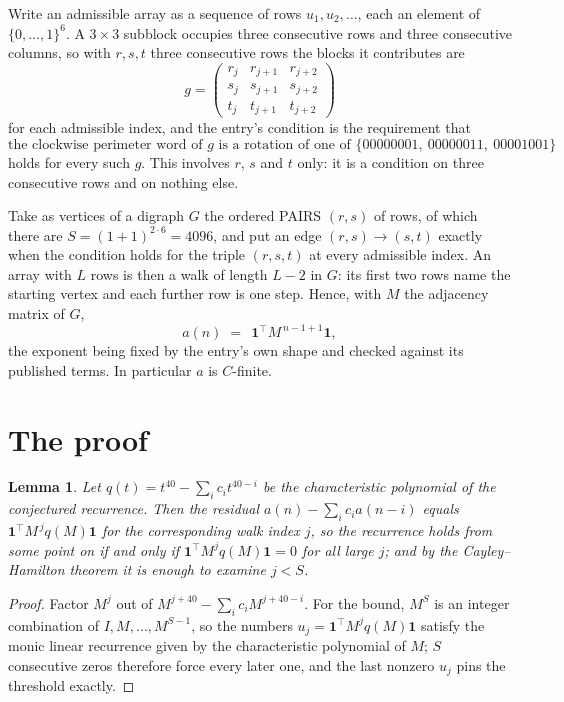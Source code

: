 \documentclass[11pt,a4paper]{article}
\theoremstyle{plain}
\newtheorem{lemma}[theorem]{Lemma}
\theoremstyle{definition}
\begin{document}
Write an admissible array as a sequence of rows $u_1,u_2,\dots$, each an element of
$\{0,\dots,1\}^{6}$. A $3\times3$ subblock occupies three consecutive rows and
three consecutive columns, so with $r,s,t$ three consecutive rows the blocks it
contributes are
\[
g=\begin{pmatrix}r_j&r_{j+1}&r_{j+2}\\ s_j&s_{j+1}&s_{j+2}\\ t_j&t_{j+1}&t_{j+2}\end{pmatrix}
\]
for each admissible index, and the entry's condition is the requirement that
\[
\text{the clockwise perimeter word of }g\text{ is a rotation of one of }\{00000001,\ 00000011,\ 00001001\}
\]
holds for every such $g$. This involves $r$, $s$ and $t$ only: it is a condition on
three consecutive rows and on nothing else.

Take as vertices of a digraph $G$ the ordered PAIRS $(r,s)$ of rows, of which there are
$S=(1+1)^{2\cdot6}=4096$, and put an edge $(r,s)\to(s,t)$ exactly when the condition
holds for the triple $(r,s,t)$ at every admissible index. An array with $L$ rows is then a
walk of length $L-2$ in $G$: its first two rows name the starting vertex and each further
row is one step. Hence, with $M$ the adjacency matrix of $G$,
\[
a(n)\;=\;\,\mathbf{1}^{\!\top}M^{\,n-1+1}\mathbf{1},
\]
the exponent being fixed by the entry's own shape and checked against its published terms.
In particular $a$ is $C$-finite.

\section{The proof}

\begin{lemma}\label{lem:crit}
Let $q(t)=t^{40}-\sum_i c_it^{40-i}$ be the characteristic polynomial of the
conjectured recurrence. Then the residual $a(n)-\sum_ic_ia(n-i)$ equals
$\mathbf{1}^{\!\top}M^{\,j}q(M)\mathbf{1}$ for the corresponding walk index
$j$, so the recurrence holds from some point on if and only if
$\mathbf{1}^{\!\top}M^{j}q(M)\mathbf{1}=0$ for all large $j$; and by the
Cayley--Hamilton theorem it is enough to examine $j<S$.
\end{lemma}

\begin{proof}
Factor $M^{j}$ out of $M^{j+40}-\sum_ic_iM^{j+40-i}$. For the bound, $M^{S}$
is an integer combination of $I,M,\dots,M^{S-1}$, so the numbers
$u_j=\mathbf{1}^{\!\top}M^{j}q(M)\mathbf{1}$ satisfy the monic linear recurrence given by
the characteristic polynomial of $M$; $S$ consecutive zeros therefore force every later one,
and the last nonzero $u_j$ pins the threshold exactly.
\end{proof}
\end{document}
